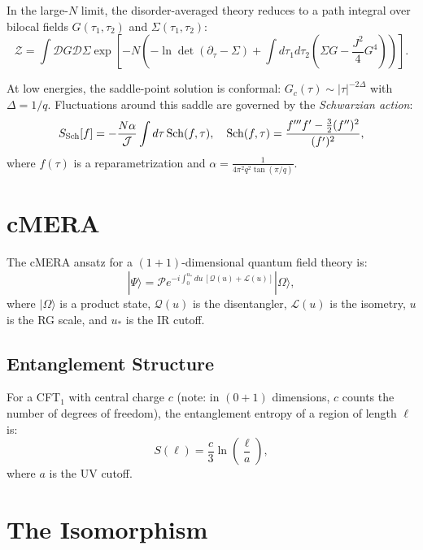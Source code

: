 \documentclass[aps,prd,reprint]{revtex4-2}
\begin{document}
In the large-$N$ limit, the disorder-averaged theory reduces to a path integral over bilocal fields $G(\tau_1, \tau_2)$ and $\Sigma(\tau_1, \tau_2)$:
\begin{equation}
\mathcal{Z} = \int \mathcal{D}G \mathcal{D}\Sigma \exp\left[-N\left(-\ln\det(\partial_\tau - \Sigma) + \int d\tau_1 d\tau_2 \left(\Sigma G - \frac{J^2}{4} G^4\right)\right)\right].
\end{equation}

At low energies, the saddle-point solution is conformal: $G_c(\tau) \sim |\tau|^{-2\Delta}$ with $\Delta = 1/q$. Fluctuations around this saddle are governed by the \emph{Schwarzian action}:
\begin{equation}
S_{\rm Sch}[f] = -\frac{N\alpha}{\mathcal{J}} \int d\tau\,\mathrm{Sch}(f, \tau), \quad \mathrm{Sch}(f, \tau) = \frac{f''' f' - \frac{3}{2}(f'')^2}{(f')^2},
\label{eq:schwarzian}
\end{equation}
where $f(\tau)$ is a reparametrization and $\alpha = \frac{1}{4\pi^2 q^2 \tan(\pi/q)}$.

\section{cMERA}
\label{sec:cmera}

The cMERA ansatz for a $(1+1)$-dimensional quantum field theory is:
\begin{equation}
|\Psi\rangle = \mathcal{P} e^{-i\int_0^{u_*} du\,[\mathcal{Q}(u) + \mathcal{L}(u)]} |\Omega\rangle,
\label{eq:cmera}
\end{equation}
where $|\Omega\rangle$ is a product state, $\mathcal{Q}(u)$ is the disentangler, $\mathcal{L}(u)$ is the isometry, $u$ is the RG scale, and $u_*$ is the IR cutoff.

\subsection{Entanglement Structure}

For a CFT$_1$ with central charge $c$ (note: in $(0+1)$ dimensions, $c$ counts the number of degrees of freedom), the entanglement entropy of a region of length $\ell$ is:
\begin{equation}
S(\ell) = \frac{c}{3}\ln\left(\frac{\ell}{a}\right),
\end{equation}
where $a$ is the UV cutoff.

\section{The Isomorphism}
\label{sec:iso}
\end{document}
